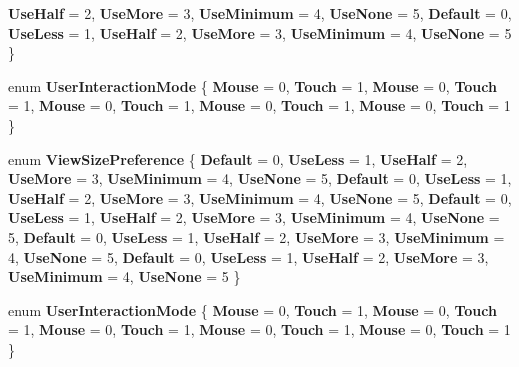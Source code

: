\begin{DoxyCompactItemize}
\newline
{\bfseries Use\+Half} = 2, 
{\bfseries Use\+More} = 3, 
{\bfseries Use\+Minimum} = 4, 
{\bfseries Use\+None} = 5, 
\newline
{\bfseries Default} = 0, 
{\bfseries Use\+Less} = 1, 
{\bfseries Use\+Half} = 2, 
{\bfseries Use\+More} = 3, 
\newline
{\bfseries Use\+Minimum} = 4, 
{\bfseries Use\+None} = 5
 \}
\item 
\mbox{\label{namespace_windows_1_1_u_i_1_1_view_management_a164710c9a26d432f77ce83ece619738d}} 
enum {\bfseries User\+Interaction\+Mode} \{ \newline
{\bfseries Mouse} = 0, 
{\bfseries Touch} = 1, 
{\bfseries Mouse} = 0, 
{\bfseries Touch} = 1, 
\newline
{\bfseries Mouse} = 0, 
{\bfseries Touch} = 1, 
{\bfseries Mouse} = 0, 
{\bfseries Touch} = 1, 
\newline
{\bfseries Mouse} = 0, 
{\bfseries Touch} = 1
 \}
\item 
\mbox{\label{namespace_windows_1_1_u_i_1_1_view_management_aa4519c5469b746d5898bd904a05a819a}} 
enum {\bfseries View\+Size\+Preference} \{ \newline
{\bfseries Default} = 0, 
{\bfseries Use\+Less} = 1, 
{\bfseries Use\+Half} = 2, 
{\bfseries Use\+More} = 3, 
\newline
{\bfseries Use\+Minimum} = 4, 
{\bfseries Use\+None} = 5, 
{\bfseries Default} = 0, 
{\bfseries Use\+Less} = 1, 
\newline
{\bfseries Use\+Half} = 2, 
{\bfseries Use\+More} = 3, 
{\bfseries Use\+Minimum} = 4, 
{\bfseries Use\+None} = 5, 
\newline
{\bfseries Default} = 0, 
{\bfseries Use\+Less} = 1, 
{\bfseries Use\+Half} = 2, 
{\bfseries Use\+More} = 3, 
\newline
{\bfseries Use\+Minimum} = 4, 
{\bfseries Use\+None} = 5, 
{\bfseries Default} = 0, 
{\bfseries Use\+Less} = 1, 
\newline
{\bfseries Use\+Half} = 2, 
{\bfseries Use\+More} = 3, 
{\bfseries Use\+Minimum} = 4, 
{\bfseries Use\+None} = 5, 
\newline
{\bfseries Default} = 0, 
{\bfseries Use\+Less} = 1, 
{\bfseries Use\+Half} = 2, 
{\bfseries Use\+More} = 3, 
\newline
{\bfseries Use\+Minimum} = 4, 
{\bfseries Use\+None} = 5
 \}
\item 
\mbox{\label{namespace_windows_1_1_u_i_1_1_view_management_a164710c9a26d432f77ce83ece619738d}} 
enum {\bfseries User\+Interaction\+Mode} \{ \newline
{\bfseries Mouse} = 0, 
{\bfseries Touch} = 1, 
{\bfseries Mouse} = 0, 
{\bfseries Touch} = 1, 
\newline
{\bfseries Mouse} = 0, 
{\bfseries Touch} = 1, 
{\bfseries Mouse} = 0, 
{\bfseries Touch} = 1, 
\newline
{\bfseries Mouse} = 0, 
{\bfseries Touch} = 1
 \}
\end{DoxyCompactItemize}
